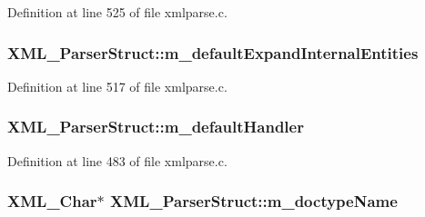 Definition at line 525 of file xmlparse.\+c.

\subsubsection[{\texorpdfstring{m\+\_\+default\+Expand\+Internal\+Entities}{m_defaultExpandInternalEntities}}]{ X\+M\+L\+\_\+\+Parser\+Struct\+::m\+\_\+default\+Expand\+Internal\+Entities}\hypertarget{struct_x_m_l___parser_struct_a271e1d18ff50a88d80059cf7f3f967ad}{}\label{struct_x_m_l___parser_struct_a271e1d18ff50a88d80059cf7f3f967ad}


Definition at line 517 of file xmlparse.\+c.

\subsubsection[{\texorpdfstring{m\+\_\+default\+Handler}{m_defaultHandler}}]{ X\+M\+L\+\_\+\+Parser\+Struct\+::m\+\_\+default\+Handler}\hypertarget{struct_x_m_l___parser_struct_ab8146045cb37e8c1081949023c2c6d72}{}\label{struct_x_m_l___parser_struct_ab8146045cb37e8c1081949023c2c6d72}


Definition at line 483 of file xmlparse.\+c.

\subsubsection[{\texorpdfstring{m\+\_\+doctype\+Name}{m_doctypeName}}]{ {\bf X\+M\+L\+\_\+\+Char}$\ast$ X\+M\+L\+\_\+\+Parser\+Struct\+::m\+\_\+doctype\+Name}\hypertarget{struct_x_m_l___parser_struct_a2c177e950a2422a965f31190cb6fbaca}{}\label{struct_x_m_l___parser_struct_a2c177e950a2422a965f31190cb6fbaca}


